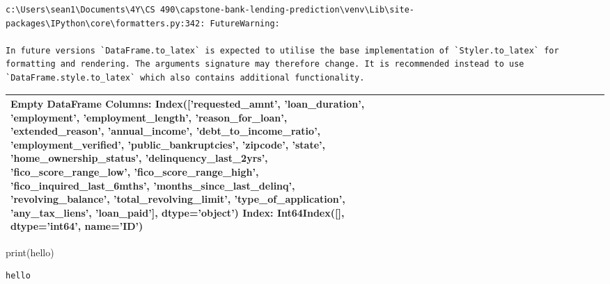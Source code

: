 \documentclass[
  letterpaper,
  DIV=11,
  numbers=noendperiod]{scrartcl}
\newenvironment{Shaded}{\begin{snugshade}}{\end{snugshade}}
\newcommand{\BuiltInTok}[1]{\textcolor[rgb]{0.00,0.23,0.31}{#1}}
\newcommand{\NormalTok}[1]{\textcolor[rgb]{0.00,0.23,0.31}{#1}}
\newcommand{\StringTok}[1]{\textcolor[rgb]{0.13,0.47,0.30}{#1}}
\begin{document}
\begin{verbatim}
c:\Users\sean1\Documents\4Y\CS 490\capstone-bank-lending-prediction\venv\Lib\site-packages\IPython\core\formatters.py:342: FutureWarning:

In future versions `DataFrame.to_latex` is expected to utilise the base implementation of `Styler.to_latex` for formatting and rendering. The arguments signature may therefore change. It is recommended instead to use `DataFrame.style.to_latex` which also contains additional functionality.
\end{verbatim}

\begin{tabular}{lrlllllrrlrlllrrrrrrrlrr}
\toprule
Empty DataFrame
Columns: Index(['requested\_amnt', 'loan\_duration', 'employment', 'employment\_length',
       'reason\_for\_loan', 'extended\_reason', 'annual\_income',
       'debt\_to\_income\_ratio', 'employment\_verified', 'public\_bankruptcies',
       'zipcode', 'state', 'home\_ownership\_status', 'delinquency\_last\_2yrs',
       'fico\_score\_range\_low', 'fico\_score\_range\_high',
       'fico\_inquired\_last\_6mths', 'months\_since\_last\_delinq',
       'revolving\_balance', 'total\_revolving\_limit', 'type\_of\_application',
       'any\_tax\_liens', 'loan\_paid'],
      dtype='object')
Index: Int64Index([], dtype='int64', name='ID') \\
\bottomrule
\end{tabular}

\begin{Shaded}
\begin{Highlighting}[]
\BuiltInTok{print}\NormalTok{(}\StringTok{\textquotesingle{}hello\textquotesingle{}}\NormalTok{)}
\end{Highlighting}
\end{Shaded}

\begin{verbatim}
hello
\end{verbatim}
\end{document}
